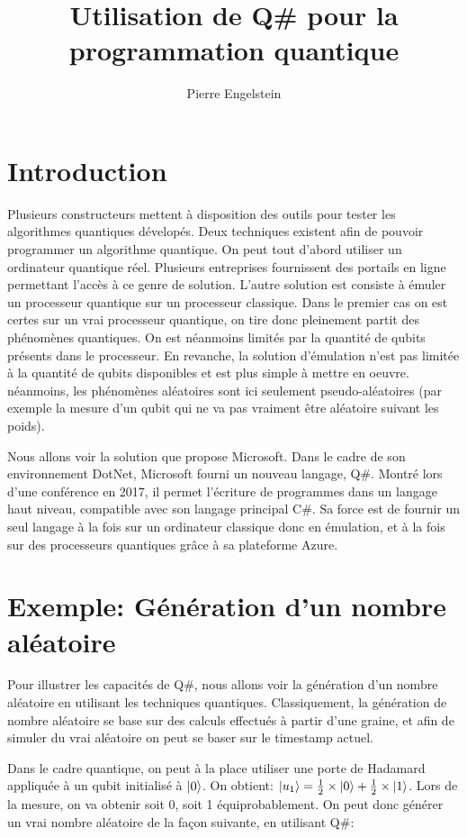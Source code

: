 \documentclass[12pt,a4paper]{article}
\title{Utilisation de Q\# pour la programmation quantique}
\author{Pierre Engelstein}
\date{}
\DeclarePairedDelimiter\ket{\lvert}{\rangle}
\begin{document}
\maketitle

\section{Introduction}
Plusieurs constructeurs mettent à disposition des outils pour tester les algorithmes quantiques dévelopés. Deux techniques existent afin de pouvoir programmer un algorithme quantique. On peut tout d'abord utiliser un ordinateur quantique réel. Plusieurs entreprises fournissent des portails en ligne permettant l'accès à ce genre de solution. L'autre solution est consiste à émuler un processeur quantique sur un processeur classique. Dans le premier cas on est certes sur un vrai processeur quantique, on tire donc pleinement partit des phénomènes quantiques. On est néanmoins limités par la quantité de qubits présents dans le processeur. En revanche, la solution d'émulation n'est pas limitée à la quantité de qubits disponibles et est plus simple à mettre en oeuvre. néanmoins, les phénomènes aléatoires sont ici seulement pseudo-aléatoires (par exemple la mesure d'un qubit qui ne va pas vraiment être aléatoire suivant les poids).

Nous allons voir la solution que propose Microsoft. Dans le cadre de son environnement DotNet, Microsoft fourni un nouveau langage, Q\#. Montré lors d'une conférence en 2017, il permet l'écriture de programmes dans un langage haut niveau, compatible avec son langage principal C\#. Sa force est de fournir un seul langage à la fois sur un ordinateur classique donc en émulation, et à la fois sur des processeurs quantiques grâce à sa plateforme Azure.

\section{Exemple: Génération d'un nombre aléatoire}
Pour illustrer les capacités de Q\#, nous allons voir la génération d'un nombre aléatoire en utilisant les techniques quantiques. Classiquement, la génération de nombre aléatoire se base sur des calculs effectués à partir d'une graine, et afin de simuler du vrai aléatoire on peut se baser sur le timestamp actuel.

Dans le cadre quantique, on peut à la place utiliser une porte de Hadamard appliquée à un qubit initialisé à $\ket{0}$. On obtient: $\ket{u_1} = \frac{1}{2} \times \ket{0} + \frac{1}{2} \times \ket{1}$. Lors de la mesure, on va obtenir soit 0, soit 1 équiprobablement. On peut donc générer un vrai nombre aléatoire de la façon suivante, en utilisant Q\#:
\end{document}
